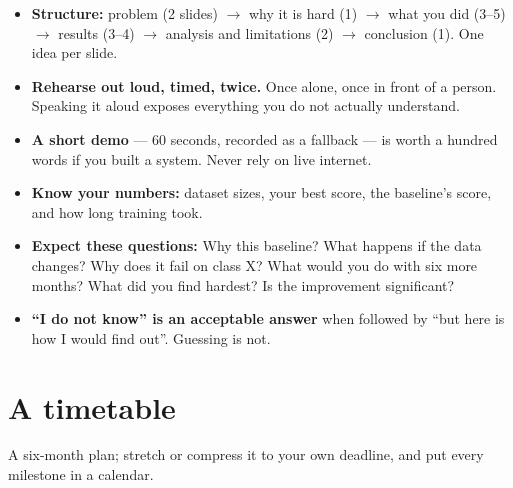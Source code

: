 \documentclass[11pt,a4paper]{article}
\begin{document}
\begin{itemize}
  \item \textbf{Structure:} problem (2 slides) $\rightarrow$ why it is hard
        (1) $\rightarrow$ what you did (3--5) $\rightarrow$ results (3--4)
        $\rightarrow$ analysis and limitations (2) $\rightarrow$ conclusion
        (1). One idea per slide.
  \item \textbf{Rehearse out loud, timed, twice.} Once alone, once in front of
        a person. Speaking it aloud exposes everything you do not actually
        understand.
  \item \textbf{A short demo} --- 60 seconds, recorded as a fallback --- is
        worth a hundred words if you built a system. Never rely on live
        internet.
  \item \textbf{Know your numbers:} dataset sizes, your best score, the
        baseline's score, and how long training took.
  \item \textbf{Expect these questions:} Why this baseline? What happens if
        the data changes? Why does it fail on class X? What would you do with
        six more months? What did you find hardest? Is the improvement
        significant?
  \item \textbf{``I do not know'' is an acceptable answer} when followed by
        ``but here is how I would find out''. Guessing is not.
\end{itemize}

\section{A timetable}

A six-month plan; stretch or compress it to your own deadline, and put every
milestone in a calendar.
\end{document}
